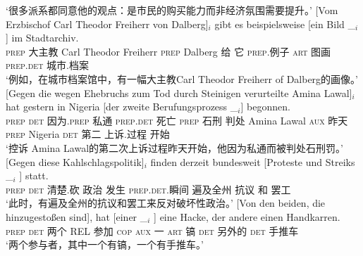 \begin{sloppypar}
\glt `很多派系都同意他的观点：是市民的购买能力而非经济氛围需要提升。'
\ex\label{bsp-von-erzbischof-bilder} 
\gll {}[Vom Erzbischof Carl Theodor Freiherr von Dalberg]$_i$ gibt es beispielsweise [ein Bild \_$_i$]
        im Stadtarchiv.\footnotemark\\
	{}\spacebr{}\textsc{prep} 大主教 Carl Theodor Freiherr \textsc{prep} Dalberg 给 它 \textsc{prep}.例子 \spacebr{}\textsc{art} 图画 {} \textsc{prep}.\textsc{det} 城市.档案\\
\glt `例如，在城市档案馆中，有一幅大主教Carl Theodor Freiherr of Dalberg的画像。'
\ex 
\gll {}[Gegen die wegen Ehebruchs zum Tod durch Steinigen verurteilte Amina Lawal]$_i$ hat gestern in Nigeria
    [der zweite Berufungsprozess \_$_i$] begonnen.\footnotemark\\
	{}\spacebr{}\textsc{prep} \textsc{det} 因为.\textsc{prep} 私通 \textsc{prep}.\textsc{det} 死亡 \textsc{prep} 石刑 判处 Amina Lawal \textsc{aux} 昨天 \textsc{prep} Nigeria \spacebr{}\textsc{det} 第二 上诉.过程 {} 开始\\
\glt `控诉 Amina Lawal的第二次上诉过程昨天开始，他因为私通而被判处石刑罚。'
\ex 
\gll {}[Gegen diese Kahlschlagspolitik]$_i$ finden derzeit bundesweit [Proteste und Streiks \_$_i$ ] statt.\footnotemark\\
	 {}\spacebr{}\textsc{prep} \textsc{det} 清楚.砍 政治 发生 \textsc{prep}.\textsc{det}.瞬间 遍及全州 \spacebr{}抗议 和 罢工 {} {} \prt{}\\
\glt `此时，有遍及全州的抗议和罢工来反对破坏性政治。'
\ex 
\gll {}[Von den beiden, die hinzugestoßen sind], hat [einer        \_$_i$ ] eine Hacke, der andere einen Handkarren.\footnotemark\\
	 {}\spacebr{}\textsc{prep} \textsc{det} 两个 REL 参加 \textsc{cop} \textsc{aux} \spacebr{}一 {}    {}  \textsc{art} 镐   \textsc{det} 另外的 \textsc{det} 手推车\\
\glt `两个参与者，其中一个有镐，一个有手推车。'

\end{sloppypar}
